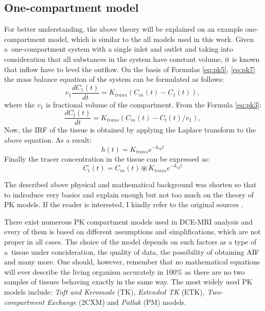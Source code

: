 \subsection{One-compartment model}
For better understanding, the above theory will be explained on an example one-compartment model, which is similar to the all models used in this work. Given a~one-compartment system with a single inlet and outlet and taking into consideration that all substances in the system have constant volume, it is known that inflow have to level the outflow. On the basis of Formulas \ref{eq:pk5}, \ref{eq:pk7} the mass balance equation of the system can be formulated as follows:
\begin{equation}
v_1\frac{dC_1(t)}{dt} = K_{trans}(C_{in}(t)-C_1(t)),
\end{equation}
where the $v_1$ is fractional volume of the compartment. From the Formula \ref{eq:pk3}:
\begin{equation}
\frac{dC_t(t)}{dt} = K_{trans}(C_{in}(t)-C_t(t)/v_1),
\label{eq:laplace}
\end{equation}
Now, the IRF of the tissue is obtained by applying the Laplace transform to the above equation. As a result:
\begin{equation}
h(t) = K_{trans}e^{-k_{ep}t}
\end{equation}
Finally the tracer concentration in the tissue can be expressed as:
\begin{equation}
	C_{t}(t) = C_{in}(t)\circledast  K_{trans}e^{-k_{ep}t} 
\end{equation}


The described above physical and mathematical background was shorten so that to indroduce very basics and explain enough but not too much on the theory of PK models. If the reader is interested, I kindly refer to the original sources \cite{sourbron2011scope}. 

There exist numerous PK compartment models used in DCE-MRI analysis and every of them is based on different assumptions and simplifications, which are not proper in all cases. The choice of the model depends on such factors as a type of a~tissue under concideration, the quality of data, the possibility of obtaining AIF and many more. One should, however, remember that no mathematical equations will ever describe the living organism accurately in 100\% as there are no two samples of tissues behaving exactly in the same way. The most widely used PK models include: \textit{Toft and Keromode} (TK), \textit{Extended TK} (ETK), \textit{Two-compartment Exchange} (2CXM) and \textit{Patlak} (PM) models.  


